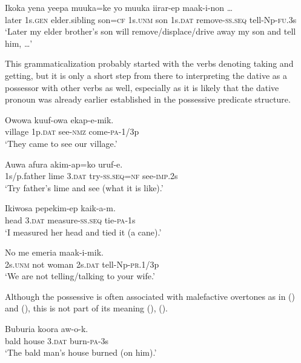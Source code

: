 \ea%
\label{ex:x1862}
\gll Ikoka yena yeepa muuka=ke yo muuka  iirar-ep maak-i-non {\dots}\\
later 1s.\textsc{gen} elder.sibling son=\textsc{cf} 1s.\textsc{unm} son 1s.\textsc{dat} remove-\textsc{ss}.\textsc{seq} tell-Np-\textsc{fu}.3s\\
\glt`Later my elder brother's son will remove/displace/drive away my son and tell him, {\dots}'
\z

This grammaticalization probably started with the verbs denoting taking and getting, but it is only a short step from there to interpreting the dative as a possessor with other verbs as well, especially as it is likely that the dative pronoun was already earlier established in the possessive predicate structure. 

\ea%
\label{ex:x1789}
\gll Owowa  kuuf-owa ekap-e-mik. \\
village 1p.\textsc{dat} see-\textsc{nmz} come-\textsc{pa}-1/3p\\
\glt`They came to see our village.'
\z

\ea%
\label{ex:x1791}
\gll Auwa afura  akim-ap=ko uruf-e. \\
1s/p.father lime 3.\textsc{dat} try-\textsc{ss}.\textsc{seq}=\textsc{nf} see-\textsc{imp}.2s\\
\glt`Try father's lime and see (what it is like).'
\z

\ea%
\label{ex:x1790}
\gll Ikiwosa  pepekim-ep kaik-a-m. \\
head 3.\textsc{dat} measure-\textsc{ss}.\textsc{seq} tie-\textsc{pa}-1s\\
\glt`I measured her head and tied it (a cane).'
\z

\ea%
\label{ex:x1795}
\gll No me emeria  maak-i-mik. \\
2s.\textsc{unm} not woman 2s.\textsc{dat} tell-Np-\textsc{pr}.1/3p\\
\glt`We are not telling/talking to your wife.'
\z

Although the possessive is often associated with malefactive overtones as in () and (), this is not part of its meaning (), (). 

\ea%
\label{ex:x1787}
\gll Buburia koora  aw-o-k. \\
bald house 3.\textsc{dat} burn-\textsc{pa}-3s \\
\glt`The bald man's house burned (on him).'
\z

